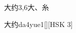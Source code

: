 \begin{entry}{大约}{3,6}{⼤、⽷}
  \begin{phonetics}{大约}{da4yue1}[][HSK 3]
  \end{phonetics}
\end{entry}
